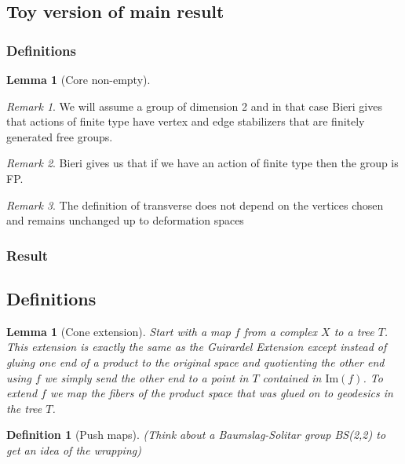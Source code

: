 \documentclass{article}
\theoremstyle{mystyle}
\newtheorem{lem}[thm]{Lemma}
\newtheorem{defn}[thm]{Definition}
\theoremstyle{remark}
\newtheorem{rmk}{Remark}[section]
\begin{document}
\subsection{Toy version of main result}


\subsubsection{Definitions}

\begin{lem}
    [Core non-empty]
    \label{lem:nonempty} 
\end{lem}

\begin{rmk}
    We will assume a group of dimension 2 and in that case Bieri gives that actions of finite type have vertex and edge stabilizers that are finitely generated free groups.
\end{rmk}

\begin{rmk}
    Bieri gives us that if we have an action of finite type then the group is FP.
\end{rmk}


\begin{rmk}
    The definition of transverse does not depend on the vertices chosen and remains unchanged up to deformation spaces
\end{rmk}

\subsubsection{Result}




\subsection{Definitions}


\begin{lem}
    [Cone extension]
    \label{lem:coneextension}
    Start with a map $f$ from a complex $X$ to a tree $T$. This extension is exactly the same as the Guirardel Extension except instead of gluing one end of a product to the original space and quotienting the other end using $f$ we simply send the other end to a point in $T$ contained in \(\text{Im}(f)\). To extend $f$ we map the fibers of the product space that was glued on to geodesics in the tree $T$.
\end{lem}

\begin{defn}
    [Push maps]
    \label{defn:pushmaps}
    (Think about a Baumslag-Solitar group BS(2,2) to get an idea of the wrapping)
\end{defn}
\end{document}
